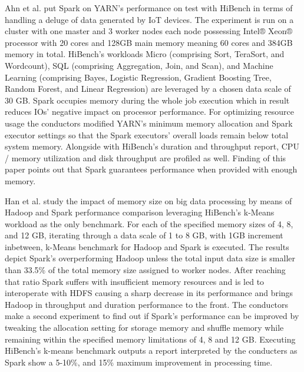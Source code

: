 \documentclass[review]{elsarticle}
\begin{document}
Ahn et al. \cite{ahn_performance_2018} put Spark on YARN’s performance on test with HiBench in terms of handling a deluge of data generated by IoT devices. The experiment is run on a cluster with one master and 3 worker nodes each node possessing Intel® Xeon® processor with 20 cores and 128GB main memory meaning 60 cores and 384GB memory in total. HiBench’s workloads Micro (comprising Sort, TeraSort, and Wordcount), SQL (comprising Aggregation, Join, and Scan), and Machine Learning (comprising Bayes, Logistic Regression, Gradient Boosting Tree, Random Forest, and Linear Regression) are leveraged by a chosen data scale of 30 GB. Spark occupies memory during the whole job execution which in result reduces IOs’ negative impact on processor performance. For optimizing resource usage the conductors modified YARN’s minimum memory allocation and Spark executor settings so that the Spark executors’ overall loads remain below total system memory. Alongside with HiBench’s duration and throughput report, CPU / memory utilization and disk throughput are profiled as well. Finding of this paper points out that Spark guarantees performance when provided with enough memory.

Han et al. \cite{han_impact_2017} study the impact of memory size on big data processing by means of Hadoop and Spark performance comparison leveraging HiBench’s k-Means workload as the only benchmark. For each of the specified memory sizes of 4, 8, and 12 GB, iterating through a data scale of 1 to 8 GB, with 1GB increment inbetween, k-Means benchmark for Hadoop and Spark is executed. The results depict Spark’s overperforming Hadoop unless the total input data size is smaller than 33.5\% of the total memory size assigned to worker nodes. After reaching that ratio Spark suffers with insufficient memory resources and is led to interoperate with HDFS causing a sharp decrease in its performance and brings Hadoop in throughput and duration performance to the front. The conductors make a second experiment to find out if Spark’s performance can be improved by tweaking the allocation setting for storage memory and shuffle memory while remaining within the specified memory limitations of 4, 8 and 12 GB. Executing HiBench’s k-means benchmark outputs a report interpreted by the conducters as Spark show a 5-10\%, and 15\% maximum improvement in processing time.
\end{document}

